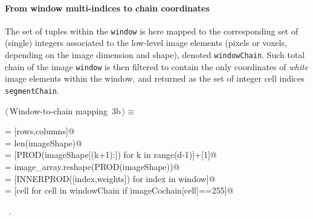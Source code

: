 \documentclass[11pt,oneside]{article}	%
\begin{document}
\paragraph{From window multi-indices to chain coordinates}

The set of tuples within the \texttt{window} is here mapped to the corresponding set of (single) integers associated to the low-level image elements (pixels or voxels, depending on the image dimension and shape), denoted \texttt{windowChain}. Such total chain of the image \texttt{window} is then filtered to contain the only coordinates of \emph{white} image elements within the window, and returned as the set of integer cell indices \texttt{segmentChain}.

\begin{flushleft} \small
\begin{minipage}{\linewidth} \label{scrap4}
\protect{}$\langle\,$Window-to-chain mapping\nobreak\ {\footnotesize 3b}$\,\rangle\equiv$
\vspace{-1ex}
\begin{list}{}{} \item
\mbox{}\verb@imageShape = [rows,columns]@\\
\mbox{}\verb@d = len(imageShape)@\\
\mbox{}\verb@weights = [PROD(imageShape[(k+1):]) for k in range(d-1)]+[1]@\\
\mbox{}\verb@imageCochain = image_array.reshape(PROD(imageShape))@\\
\mbox{}\verb@windowChain = [INNERPROD([index,weights]) for index in window]@\\
\mbox{}\verb@segmentChain = [cell for cell in windowChain if imageCochain[cell]==255]@\\
\mbox{}\verb@@{\NWsep}
\end{list}
\vspace{-1ex}
\footnotesize\addtolength{\baselineskip}{-1ex}
\begin{list}{}{\setlength{\itemsep}{-\parsep}\setlength{\itemindent}{-\leftmargin}}
\item \NWtxtMacroRefIn\ .
\end{list}
\end{minipage}\\[4ex]
\end{flushleft}
\end{document}
